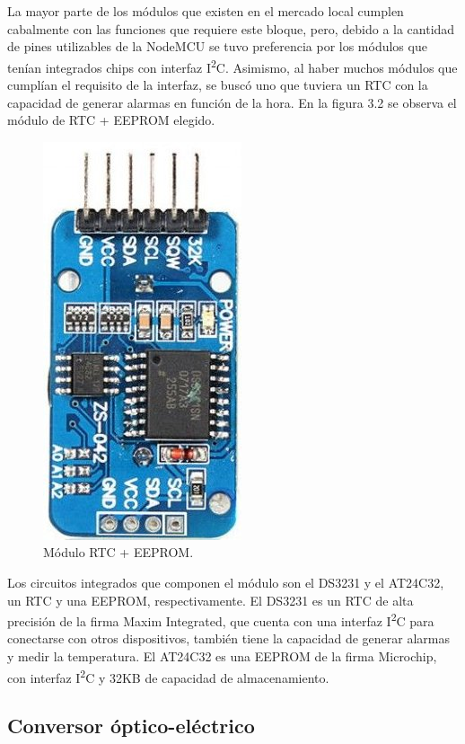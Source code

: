 La mayor parte de los módulos que existen en el mercado local cumplen cabalmente con las funciones que requiere este bloque, pero, debido a la cantidad de pines utilizables de la NodeMCU se tuvo preferencia por los módulos que tenían integrados chips con interfaz I\textsuperscript{2}C. Asimismo, al haber muchos módulos que cumplían el requisito de la interfaz, se buscó uno que tuviera un RTC con la capacidad de generar alarmas en función de la hora. En la figura 3.2 se observa el módulo de RTC + EEPROM elegido.

\begin{figure}[h]
	\centering
	\includegraphics[scale=0.45]{./Figures/rtc_eeprom.jpg}
	\caption{Módulo RTC + EEPROM\protect\footnotemark.}
		\label{fig:cuadradoAzul}
	\end{figure}


Los circuitos integrados que componen el módulo son el DS3231 y el AT24C32, un RTC y una EEPROM, respectivamente. El DS3231 es un RTC de alta precisión de la firma Maxim Integrated, que cuenta con una interfaz I\textsuperscript{2}C para conectarse con otros dispositivos, también tiene la capacidad de generar alarmas y medir la temperatura. El AT24C32 es una EEPROM de la firma Microchip, con interfaz I\textsuperscript{2}C y 32KB de capacidad de almacenamiento.

\subsection{Conversor óptico-eléctrico}

